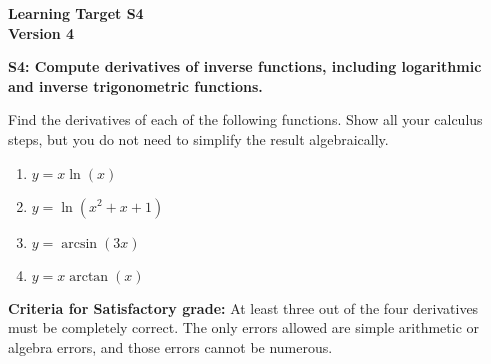\documentclass[10pt]{article}
\begin{document}
	\vspace*{0in}

		\begin{center}
			\textbf{Learning Target S4 \\
			Version 4} 
		\end{center}


\begin{framed}
	\textbf{S4: Compute derivatives of inverse functions, including logarithmic and inverse trigonometric functions.}
\end{framed}

Find the derivatives of each of the following functions. Show all your calculus steps, but you do not need to simplify the result algebraically. 

\begin{enumerate}
    \item $y = x \ln(x)$
    \item $y = \ln (x^2 + x + 1)$
    \item $y = \arcsin(3x)$
    \item $y = x \arctan (x)$
\end{enumerate}

\vfill


\begin{small}
    \begin{framed}
        	\textbf{Criteria for Satisfactory grade:} At least three out of the four derivatives must be completely correct. The only errors allowed are simple arithmetic or algebra errors, and those errors cannot be numerous.
    \end{framed}

\end{small}
\end{document}
